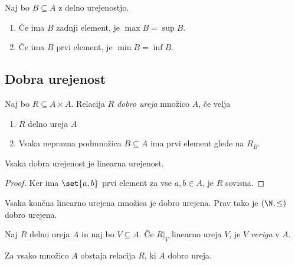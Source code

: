 \documentclass[12pt, a4paper]{article}
\begin{document}
\begin{opomba}
Naj bo $B\subseteq A$ z delno urejenostjo.

\begin{enumerate}
\item Če ima $B$ zadnji element, je $\max B=\sup B$.
\item Če ima $B$ prvi element, je $\min B=\inf B$.
\end{enumerate}
\end{opomba}

\newpage

\subsection{Dobra urejenost}

\begin{okvir}
\begin{definicija}
Naj bo $R\subseteq A\times A$. Relacija $R$ \emph{dobro ureja} množico $A$, če velja

\begin{enumerate}
\item $R$ delno ureja $A$
\item Vsaka neprazna podmnožica $B\subseteq A$ ima prvi element glede na $R_B$.
\end{enumerate}
\end{definicija}
\end{okvir}

\begin{trditev}
Vsaka dobra urejenost je linearna urejenost.
\end{trditev}

\begin{proof}
Ker ima $\set{a,b}$ prvi element za vse $a,b\in A$, je $R$ sovisna.
\end{proof}

\begin{opomba}
Vsaka končna linearno urejena množica je dobro urejena. Prav tako je $(\N,\leq)$ dobro urejena.
\end{opomba}

\begin{definicija}
Naj $R$ delno ureja $A$ in naj bo $V\subseteq A$. Če $R|_V$ linearno ureja $V$, je $V$ \emph{veriga} v $A$.
\end{definicija}

\begin{izrek}
Za vsako množico $A$ obstaja relacija $R$, ki $A$ dobro ureja.
\end{izrek}
\end{document}
